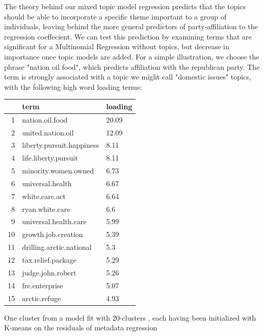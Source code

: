 \documentclass[12pt]{article}
\begin{document}
The theory behind our mixed topic model regression predicts that the topics should be able to incorporate a specific theme important to a group of individuals, leaving behind the more general predictors of party-affiliation to the regression coeffecient.
We can test this prediction by examining terms that are significant for a Multinomial Regression without topics, but decrease in importance once topic models are added. For a simple illustration, we choose the phrase "nation oil food", which predicts affiliation with the republican party.  The term is strongly associated with a topic we might call "domestic issues" topics, with the following high word loading terms:





\begin{table}[ht]
\centering
\begin{threeparttable}
\begin{tabular}{rll}
  \hline
 & term & loading \\ 
  \hline
1 & nation.oil.food & 20.09 \\ 
  2 & united.nation.oil & 12.09 \\ 
  3 & liberty.pursuit.happiness & 8.11 \\ 
  4 & life.liberty.pursuit & 8.11 \\ 
  5 & minority.women.owned & 6.73 \\ 
  6 & universal.health & 6.67 \\ 
  7 & white.care.act & 6.64 \\ 
  8 & ryan.white.care & 6.6 \\ 
  9 & universal.health.care & 5.99 \\ 
  10 & growth.job.creation & 5.39 \\ 
  11 & drilling.arctic.national & 5.3 \\ 
  12 & tax.relief.package & 5.29 \\ 
  13 & judge.john.robert & 5.26 \\ 
  14 & fre.enterprise & 5.07 \\ 
  15 & arctic.refuge & 4.93 \\ 
   \hline
\end{tabular}
\begin{tablenotes}
\small
\item One cluster from a model fit with 20-clusters , each having been initialized with K-means on the residuals of metadata regression
\end{tablenotes}
\end{threeparttable}
\end{table}
\end{document}
